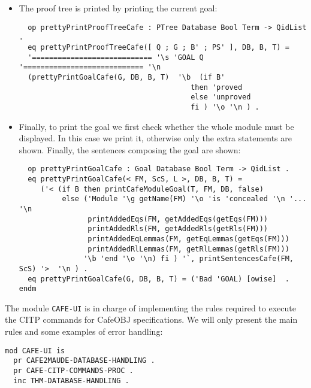\begin{itemize}
\item
The proof tree is printed by printing the current goal:

{\codesize
\begin{verbatim}
  op prettyPrintProofTreeCafe : PTree Database Bool Term -> QidList .
  eq prettyPrintProofTreeCafe([ Q ; G ; B' ; PS' ], DB, B, T) =
  '============================ '\s 'GOAL Q '============================ '\n
  (prettyPrintGoalCafe(G, DB, B, T)  '\b  (if B'
                                        then 'proved
                                        else 'unproved
                                        fi ) '\o '\n ) .
\end{verbatim}
}

\item
Finally, to print the goal we first check whether the whole module must be displayed.
In this case we print it, otherwise only the extra statements are shown. Finally, the
sentences composing the goal are shown:

{\codesize
\begin{verbatim}
  op prettyPrintGoalCafe : Goal Database Bool Term -> QidList .
  eq prettyPrintGoalCafe(< FM, ScS, L >, DB, B, T) =
     ('< (if B then printCafeModuleGoal(T, FM, DB, false)
          else ('Module '\g getName(FM) '\o 'is 'concealed '\n '... '\n
                printAddedEqs(FM, getAddedEqs(getEqs(FM)))
                printAddedRls(FM, getAddedRls(getRls(FM)))
                printAddedEqLemmas(FM, getEqLemmas(getEqs(FM)))
                printAddedRlLemmas(FM, getRlLemmas(getRls(FM)))
               '\b 'end '\o '\n) fi ) '`, printSentencesCafe(FM, ScS) '>  '\n ) .
  eq prettyPrintGoalCafe(G, DB, B, T) = ('Bad 'GOAL) [owise]  .
endm
\end{verbatim}
}

\end{itemize}

The module \verb"CAFE-UI" is in charge of implementing the rules required to
execute the CITP commands for CafeOBJ specifications. We will only present the
main rules and some examples of error handling:

{\codesize
\begin{verbatim}
mod CAFE-UI is
  pr CAFE2MAUDE-DATABASE-HANDLING .
  pr CAFE-CITP-COMMANDS-PROC .
  inc THM-DATABASE-HANDLING .
\end{verbatim}
}

{\codesize
\begin{comment}
  var  X@Database : CafeDatabaseClass .
  vars ME ME' ME'' : ModuleExpression .
  vars DB DB' DB'' : Database .
  var  Atts : AttributeSet .
  vars QIL QIL' : QidList .
  vars TL TL' : TermList .
  vars P P' P'' : PTree .
  var  ODS : OpDeclSet .
  vars T T' T1 : Term .
  vars M M' : Module .
  var  PS : PTreeSet .
  vars Q GID : Qid .
  var  B : Bool .
  var  N : Nat .
  var  O : Oid .
\end{comment}
}


